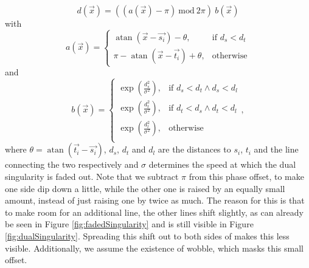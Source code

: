 \documentclass{utue} %
\DeclareMathOperator{\atan}{atan}
\begin{document}
$$
d(\vec{x}) = ((a(\vec{x})-\pi)\ \mathrm{mod}\ 2\pi)\ b(\vec{x})
$$
with
$$
  a(\vec{x}) = \begin{cases}
  \atan(\vec{x}-\vec{s_i}) - \theta, &\text{if }d_s < d_t\\
  \pi - \atan(\vec{x}-\vec{t_i}) + \theta, &\text{otherwise}
  \end{cases}
$$
and
$$
  b(\vec{x}) = \begin{cases}
    \exp\left (\frac{d_s^2}{\sigma^2}\right ), &\text{if }d_s < d_t \land d_s < d_l\\
    \exp\left (\frac{d_t^2}{\sigma^2}\right ), &\text{if }d_t < d_s \land d_t < d_l\\
    \exp\left (\frac{d_l^2}{\sigma^2}\right ), &\text{otherwise}\\
  \end{cases},
$$
where $\theta=\atan(\vec{t_i}-\vec{s_i})$, $d_s$, $d_t$ and $d_l$ are the distances to $s_i$, $t_i$ and the line connecting the two respectively and $\sigma$ determines the speed at which the dual singularity is faded out. Note that we subtract $\pi$ from this phase offset, to make one side dip down a little, while the other one is raised by an equally small amount, instead of just raising one by twice as much. The reason for this is that to make room for an additional line, the other lines shift slightly, as can already be seen in Figure \ref{fig:fadedSingularity} and is still visible in Figure \ref{fig:dualSingularity}. Spreading this shift out to both sides of makes this less visible. Additionally, we assume the existence of wobble, which masks this small offset.
\end{document}
